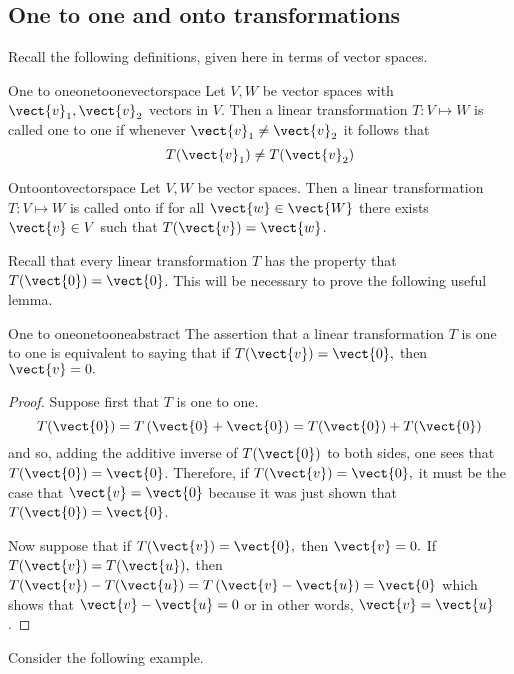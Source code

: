 \subsection{One to one and onto transformations}

Recall the following definitions, given here in terms of vector spaces.

\begin{definition}{One to one}{onetoonevectorspace}
Let $V, W$ be vector spaces with $\vect{v}_1, \vect{v}_2$ vectors in $V$. Then a linear transformation $T: V \mapsto W$ is called one to one if whenever $\vect{v}_1 \neq \vect{v}_2$ it follows that 
\[
T(\vect{v}_1) \neq T (\vect{v}_2)
\]
\end{definition}

\begin{definition}{Onto}{ontovectorspace}
Let $V, W$ be vector spaces. Then a linear transformation $T: V \mapsto W$ is called onto if for all $\vect{w} \in \vect{W}$ there exists $\vect{v} \in V$ such that $T(\vect{v}) = \vect{w}$. 
\end{definition}

Recall that every linear transformation $T$ has the property that $T(\vect{0})=\vect{0}$. This will be necessary to prove the following useful lemma. 

\begin{lemma}{One to one}{onetooneabstract}
The assertion that a linear transformation $T$ is one to one is equivalent to
saying that if $T(\vect{v})=\vect{0},$ then $\vect{v}=0.$ 
\end{lemma}

\begin{proof}
Suppose first that $T$ is one to one. 
\begin{equation*}
T(\vect{0})=T\left( \vect{0}+\vect{0}\right) =T(\vect{0})+T(\vect{0})
\end{equation*}
and so, adding the additive inverse of $T(\vect{0})$ to both sides, one sees
that $T(\vect{0})=\vect{0}$. Therefore, if $T(\vect{v})=\vect{0},$ it must be the
case that $\vect{v}=\vect{0}$ because it was just shown that $T(\vect{0})=\vect{0}$.

Now suppose that if $T(\vect{v})=\vect{0},$ then $\vect{v}=0.$ If $T(\vect{v})=T(\vect{u}),$ then $T(\vect{v})-T(\vect{u})=T\left( \vect{v}-\vect{u}\right) =\vect{0}$ which
shows that $\vect{v}-\vect{u}=0$ or in other words, $\vect{v}=\vect{u}$. 
\end{proof}

Consider the following example.

